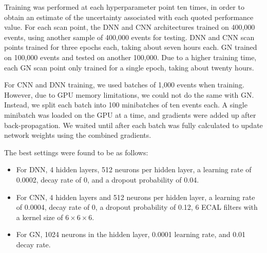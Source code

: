 Training was performed at each hyperparameter point ten times, in order to obtain an estimate of the uncertainty associated with each quoted performance value. For each scan point, the DNN and CNN architectures trained on 400,000 events, using another sample of 400,000 events for testing. DNN and CNN scan points trained for three epochs each, taking about seven hours each. GN trained on 100,000 events and tested on another 100,000. Due to a higher training time, each GN scan point only trained for a single epoch, taking about twenty hours.

For CNN and DNN training, we used batches of 1,000 events when training. However, due to GPU memory limitations, we could not do the same with GN. Instead, we split each batch into 100 minibatches of ten events each. A single minibatch was loaded on the GPU at a time, and gradients were added up after back-propagation. We waited until after each batch was fully calculated to update network weights using the combined gradients.

The best settings were found to be as follows:
\begin{itemize}
    \item For DNN, 4 hidden layers, 512 neurons per hidden layer, a learning rate of 0.0002, decay rate of 0, and a dropout probability of 0.04.
    \item For CNN, 4 hidden layers and 512 neurons per hidden layer, a learning rate of 0.0004, decay rate of 0, a dropout probability of 0.12, 6 ECAL filters with a kernel size of $6 \times 6 \times 6$.
    \item For GN, 1024 neurons in the hidden layer, 0.0001 learning rate, and 0.01 decay rate. 
\end{itemize}

